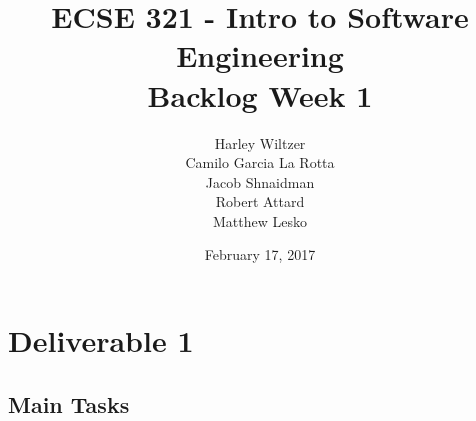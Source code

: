 \documentclass[12pt]{article}
\title{ECSE 321 - Intro to Software Engineering\\Backlog Week 1}
\author{Harley Wiltzer\\Camilo Garcia La Rotta\\Jacob Shnaidman\\Robert Attard\\Matthew Lesko}
\date{February 17, 2017}
\begin{document}
\maketitle
\newpage
{} %

\section{Deliverable 1}

\subsection{Main Tasks}

\end{document}

